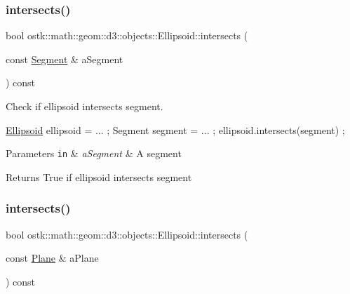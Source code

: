 \subsubsection{\texorpdfstring{intersects()}{intersects()}\hspace{0.1cm}{\footnotesize\ttfamily [5/10]}}
{\footnotesize\ttfamily bool ostk\+::math\+::geom\+::d3\+::objects\+::\+Ellipsoid\+::intersects (\begin{DoxyParamCaption}\item[{const \hyperlink{classostk_1_1math_1_1geom_1_1d3_1_1objects_1_1_segment}{Segment} \&}]{a\+Segment }\end{DoxyParamCaption}) const}



Check if ellipsoid intersects segment. 


\begin{DoxyCode}
\hyperlink{classostk_1_1math_1_1geom_1_1d3_1_1objects_1_1_ellipsoid_a106c71abf9503f3d06b2613c1c7e9d65}{Ellipsoid} ellipsoid = ... ;
Segment segment = ... ;
ellipsoid.intersects(segment) ;
\end{DoxyCode}



\begin{DoxyParams}[1]{Parameters}
\mbox{\tt in}  & {\em a\+Segment} & A segment \\
\hline
\end{DoxyParams}
\begin{DoxyReturn}{Returns}
True if ellipsoid intersects segment 
\end{DoxyReturn}
\mbox{\label{classostk_1_1math_1_1geom_1_1d3_1_1objects_1_1_ellipsoid_a996a2dfe962cdb5dd5b16e3ee9bfdf62}} 
\subsubsection{\texorpdfstring{intersects()}{intersects()}\hspace{0.1cm}{\footnotesize\ttfamily [6/10]}}
{\footnotesize\ttfamily bool ostk\+::math\+::geom\+::d3\+::objects\+::\+Ellipsoid\+::intersects (\begin{DoxyParamCaption}\item[{const \hyperlink{classostk_1_1math_1_1geom_1_1d3_1_1objects_1_1_plane}{Plane} \&}]{a\+Plane }\end{DoxyParamCaption}) const}



